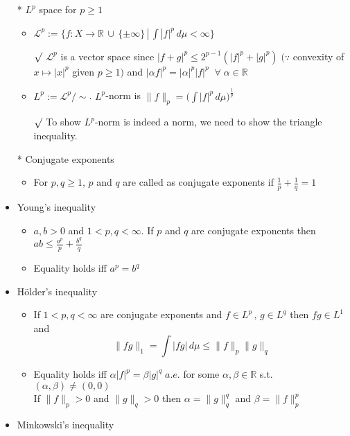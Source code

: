 \documentclass[12pt]{article}
\newcommand{\rmk}{$\surd$}
\newcommand{\R}{\mathbb{R}}
\newcommand{\LL}{\mathcal{L}}
\newcommand{\forany}{\; \forall \;}
\newcommand{\union}{\,\cup\,}
\begin{document}
\begin{itemize}
    \item[*] $L^p$ space for $p\geq 1$
    \begin{itemize}
        \item $\LL^p:=\big\{f:X\rightarrow \R\union \{\pm \infty\}\,|\, \int |f|^p\, d\mu <\infty\big\}$
        \item[\rmk] $\LL^p$ is a vector space since $|f+g|^p\leq 2^{p-1}(|f|^p+|g|^p)\;(\because$ convexity of $x\mapsto |x|^p$ given $p\geq 1)$ and $|\alpha f|^p=|\alpha|^p|f|^p\;\forany \alpha\in \R$
        \item $L^p:=\LL^p/\sim$. \quad $L^p$-norm is $\|f\|_p=\Big(\int |f|^p \, d\mu\Big)^{\frac{1}{p}}$
        \item[\rmk] To show $L^p$-norm is indeed a norm, we need to show the triangle inequality.  
    \end{itemize}
    \item[*] Conjugate exponents
    \begin{itemize}
        \item For $p,q\geq1$, $p$ and $q$ are called as conjugate exponents if $\frac{1}{p}+\frac{1}{q}=1$
    \end{itemize}  
    \item Young's inequality
    \begin{itemize}
        \item $a,b>0$ and $1<p,q<\infty$. If $p$ and $q$ are conjugate exponents then $ab\leq \frac{a^p}{p}+\frac{b^q}{q}$
        \item Equality holds iff $a^p=b^q$ 
    \end{itemize}
    \item H\"older's inequality
    \begin{itemize}
        \item If $1<p,q<\infty$ are conjugate exponents and $f\in L^p\, ,\, g\in L^q$ then $fg\in L^1$ and \begin{equation*}
            \|fg\|_1=\int |fg|\, d\mu \leq \|f\|_p\|g\|_q
        \end{equation*}
        \item Equality holds iff $\alpha |f|^p=\beta |g|^q \; a.e.$ for some $\alpha, \beta\in \R$ s.t. $(\alpha, \beta)\neq (0,0)$  \\ If $\|f\|_p>0$ and $\|g\|_q>0$ then $\alpha=\|g\|_q^q$ and $\beta=\|f\|_p^p$
    \end{itemize}
    \item Minkowski's inequality
    \begin{itemize}

\end{itemize}
\end{itemize}
\end{document}
